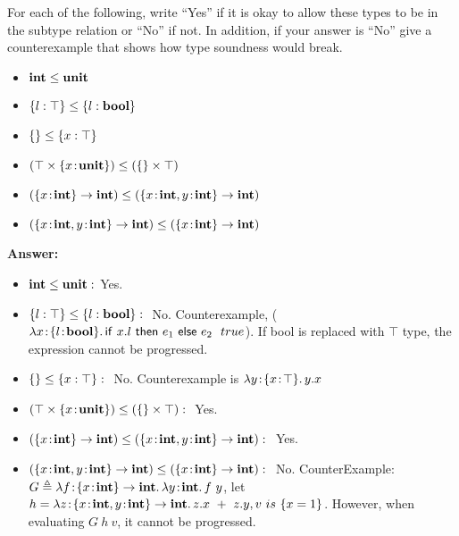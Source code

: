 \documentclass[10pt]{article}
\begin{document}
\begin{exercise}
  For each of the following, write ``Yes'' if it is okay to allow
  these types to be in the subtype relation or ``No'' if not. In
  addition, if your answer is ``No'' give a counterexample that shows
  how type soundness would break.
\begin{itemize}
\item $\typ{int} \subty \typ{unit}$
\item $\{ l : \top \} \subty \{ l : \typ{bool} \}$
\item $\{ \} \subty \{ x : \top \}$ 
\item $(\top \times \{ x \ty \typ{unit} \}) \subty (\{\} \times \top)$
\item $(\{ x \ty \typ{int} \} \arrow \typ{int}) \subty (\{ x \ty \typ{int}, y \ty \typ{int} \} \arrow \typ{int})$
\item $(\{ x \ty \typ{int}, y \ty \typ{int} \} \arrow \typ{int}) \subty (\{ x \ty \typ{int} \} \arrow \typ{int})$
\end{itemize}
\noindent \textbf{Answer:}
\begin{itemize}
\item $\typ{int} \subty \typ{unit}:$ Yes.
\item $\{ l : \top \} \subty \{ l : \typ{bool} \}: \ $ No. Counterexample, ($\lam{x\ty \{l\ty\typ{bool}\}}{\cond[\lamfnt]{x.l}{e_1}{e_2}} \ \ true$). If bool is replaced with $\top$ type, the expression cannot be progressed.
\item $\{ \} \subty \{ x : \top \}: \ $ No. Counterexample is $\lam{y\ty\{x\ty\top\}}{y.x}$
\item $(\top \times \{ x \ty \typ{unit} \}) \subty (\{\} \times \top): \ $ Yes.
\item $(\{ x \ty \typ{int} \} \arrow \typ{int}) \subty (\{ x \ty \typ{int}, y \ty \typ{int} \} \arrow \typ{int}): \ $ Yes.
\item $(\{ x \ty \typ{int}, y \ty \typ{int} \} \arrow \typ{int}) \subty (\{ x \ty \typ{int} \} \arrow \typ{int}): \ $ No. CounterExample: $G \triangleq \lam{f\ty \{ x \ty \typ{int} \} \rightarrow \typ{int}}{\lam{y\ty \typ{int}}{f~y}}$, let $ h = \lam{z\ty \{ x \ty \typ{int}, y \ty \typ{int} \} \arrow \typ{int}}{z.x \ + \ z.y}, v \ is \ \{x=1\}$. However, when evaluating $G~h~v$, it cannot be progressed. 
\end{itemize}
\end{exercise}
\end{document}
